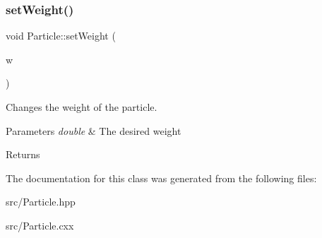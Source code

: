 \subsubsection{\texorpdfstring{set\+Weight()}{setWeight()}}
{\footnotesize\ttfamily void Particle\+::set\+Weight (\begin{DoxyParamCaption}\item[{double}]{w }\end{DoxyParamCaption})}



Changes the weight of the particle. 


\begin{DoxyParams}{Parameters}
{\em double} & The desired weight\\
\hline
\end{DoxyParams}
\begin{DoxyReturn}{Returns}

\end{DoxyReturn}


The documentation for this class was generated from the following files\+:\begin{DoxyCompactItemize}
\item 
src/Particle.\+hpp\item 
src/Particle.\+cxx\end{DoxyCompactItemize}
